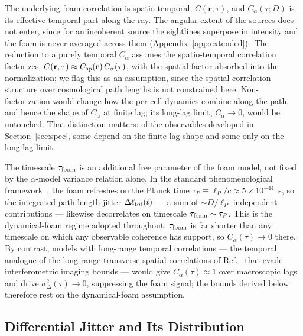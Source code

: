 \documentclass[aps,prd,onecolumn,amsmath,amssymb]{revtex4-2}
\begin{document}
The underlying foam correlation is spatio-temporal,
$C(\mathbf{r},\tau)$, and $C_\alpha(\tau;D)$ is its effective temporal part
along the ray. The angular extent of the sources does not enter, since for an incoherent
source the sightlines superpose in intensity and the foam is never averaged
across them (Appendix~\ref{app:extended}).\   The reduction to a
purely temporal $C_\alpha$ assumes the spatio-temporal correlation
factorizes, $C(\mathbf{r},\tau)\approx C_{\rm sp}(\mathbf{r})\,C_\alpha(\tau)$,
with the spatial factor absorbed into the normalization; we flag this as an
assumption, since the spatial correlation structure over cosmological path
lengths is not constrained here.  Non-factorization would change how the per-cell
dynamics combine along the path, and hence the shape of $C_\alpha$ at finite
lag; its long-lag limit, $C_\alpha\to0$, would be untouched.  That
distinction matters: of the observables developed in
Section~\ref{sec:spec}, some depend on the finite-lag shape and some only on
the long-lag limit.\ 

The timescale $\tau_{\rm foam}$ is an additional free parameter of the
foam model, not fixed by the $\alpha$-model variance relation alone.
In the standard phenomenological framework~\cite{AmelinoCamelia2013,Ng2003},
the foam refreshes on the Planck time
$\tau_P \equiv \ell_P/c \approx 5\times10^{-44}$~s, so the integrated
path-length jitter $\Delta\ell_{\rm tot}(t)$ --- a sum of
$\sim D/\ell_P$ independent contributions --- likewise decorrelates on
timescale $\tau_{\rm foam}\sim\tau_P$.  This is the dynamical-foam
regime adopted throughout: $\tau_{\rm foam}$ is far shorter than any
timescale on which any observable coherence has support, so
$C_\alpha(\tau)\to 0$ there.  By contrast, models with long-range
temporal correlations --- the temporal analogue of the long-range
transverse spatial correlations of Ref.~\cite{LeeZurekChen2024}
that evade interferometric imaging bounds --- would give
$C_\alpha(\tau)\approx 1$ over macroscopic lags and drive
$\sigma_\Delta^2(\tau)\to 0$, suppressing the foam signal; the bounds
derived below therefore rest on the dynamical-foam assumption.

\subsection{Differential Jitter and Its Distribution}
\label{sec:differential_jitter}
\end{document}
